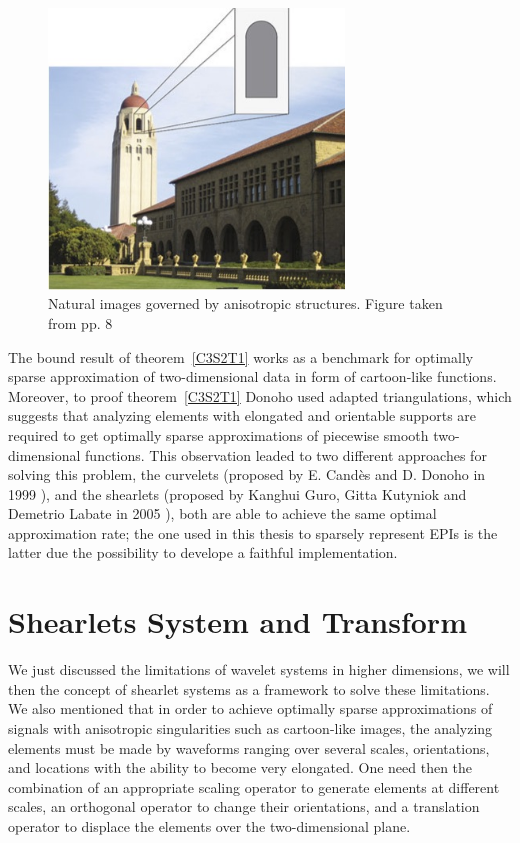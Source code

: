 \begin{figure}[h!]
\centering
\includegraphics[width = 0.7\textwidth]{./Diagrams/edges-images.jpg}
\caption{Natural images governed by anisotropic structures. Figure taken from \cite{IntroShearlets} pp. 8}
\label{edges-images}
\end{figure}

\bigskip

The bound result of theorem~\ref{C3S2T1} works as a benchmark for optimally sparse approximation of two-dimensional data in form of cartoon-like functions. Moreover, to proof theorem~\ref{C3S2T1} Donoho used adapted triangulations, which suggests that analyzing elements with elongated and orientable supports are required to get optimally sparse approximations of piecewise smooth two-dimensional functions. This observation leaded to two different approaches for solving this problem, the curvelets (proposed by E. Candès and D. Donoho in 1999 \cite{Curvelets}), and the shearlets (proposed by Kanghui Guro, Gitta Kutyniok and Demetrio Labate in 2005 \cite{FirstShearlets}), both are able to achieve the same optimal approximation rate; the one used in this thesis to sparsely represent EPIs is the latter due the possibility to develope a faithful implementation. 

\section{Shearlets System and Transform}
\label{sec:shearletsystem}

We just discussed the limitations of wavelet systems in higher dimensions, we will then the concept of shearlet systems as a framework to solve these limitations. We also mentioned that in order to achieve optimally sparse approximations of signals with anisotropic singularities such as cartoon-like images, the analyzing elements must be made by waveforms ranging over several scales, orientations, and locations with the ability to become very elongated. One need then the combination of an appropriate scaling operator to generate elements at different scales, an orthogonal operator to change their orientations, and a translation operator to displace the elements over the two-dimensional plane. 

